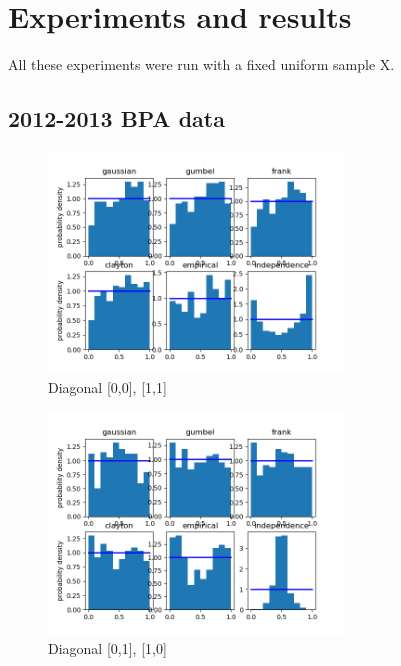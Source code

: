 \section{Experiments and results}\label{res}

All these experiments were run with a fixed uniform sample X.

\subsection{2012-2013 BPA data}



\begin{figure}[h]
	\centering
	\includegraphics[width=0.7\textwidth]{2013-01-17_05_00-2013-01-17_06_00-0.png}
	\caption{Diagonal [0,0], [1,1]}
\end{figure}

\begin{figure}[h]
	\centering
	\includegraphics[width=0.7\textwidth]{2013-01-17_05_00-2013-01-17_06_00-1.png}
	\caption{Diagonal [0,1], [1,0]}
\end{figure}



